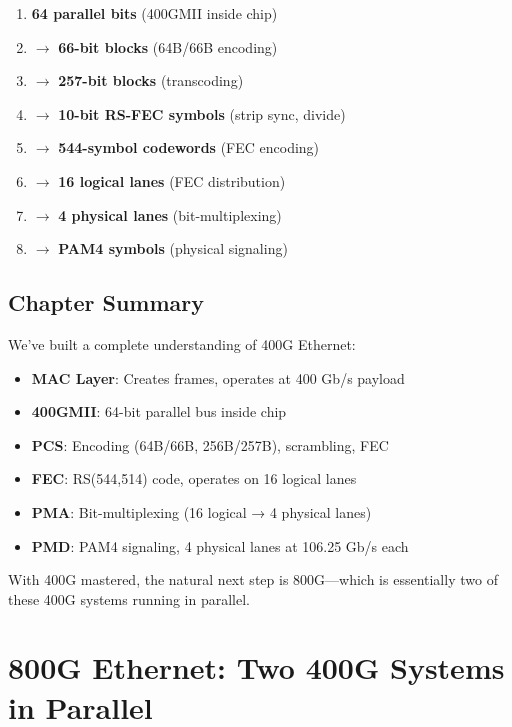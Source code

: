 \documentclass[openany]{tufte-book}
\begin{document}
\begin{enumerate}
\item \textbf{64 parallel bits} (400GMII inside chip)
\item $\rightarrow$ \textbf{66-bit blocks} (64B/66B encoding)
\item $\rightarrow$ \textbf{257-bit blocks} (transcoding)
\item $\rightarrow$ \textbf{10-bit RS-FEC symbols} (strip sync, divide)
\item $\rightarrow$ \textbf{544-symbol codewords} (FEC encoding)
\item $\rightarrow$ \textbf{16 logical lanes} (FEC distribution)
\item $\rightarrow$ \textbf{4 physical lanes} (bit-multiplexing)
\item $\rightarrow$ \textbf{PAM4 symbols} (physical signaling)
\end{enumerate}

\section{Chapter Summary}

We've built a complete understanding of 400G Ethernet:

\begin{itemize}
\item \textbf{MAC Layer}: Creates frames, operates at 400 Gb/s payload
\item \textbf{400GMII}: 64-bit parallel bus inside chip
\item \textbf{PCS}: Encoding (64B/66B, 256B/257B), scrambling, FEC
\item \textbf{FEC}: RS(544,514) code, operates on 16 logical lanes
\item \textbf{PMA}: Bit-multiplexing (16 logical → 4 physical lanes)
\item \textbf{PMD}: PAM4 signaling, 4 physical lanes at 106.25 Gb/s each
\end{itemize}

With 400G mastered, the natural next step is 800G---which is essentially two of these 400G systems running in parallel.


\chapter{800G Ethernet: Two 400G Systems in Parallel}
\end{document}
